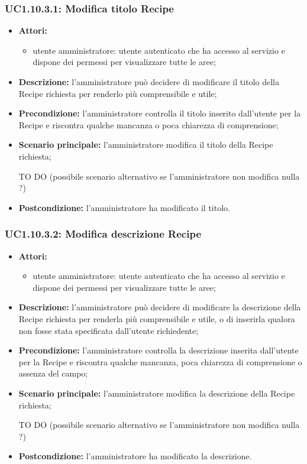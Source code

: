 \subsubsection{UC1.10.3.1: Modifica titolo Recipe}
	\begin{itemize}
		\item \textbf{Attori:}
		\begin{itemize}
			\item utente amministratore: utente autenticato che ha accesso al servizio e dispone dei permessi per visualizzare tutte le aree;
		\end{itemize}
		\item \textbf{Descrizione:} l'amministratore può decidere di modificare il titolo della Recipe richiesta per renderlo più comprensibile e utile;
		\item \textbf{Precondizione:} l'amministratore controlla il titolo inserito dall'utente per la Recipe e riscontra qualche mancanza o poca chiarezza di comprensione;
		\item \textbf{Scenario principale:} l'amministratore modifica il titolo della Recipe richiesta;
		\item [TO DO] (possibile scenario alternativo se l'amministratore non modifica nulla ?)
		\item \textbf{Postcondizione:} l'amministratore ha modificato il titolo.
	\end{itemize}

\subsubsection{UC1.10.3.2: Modifica descrizione Recipe}
	\begin{itemize}
		\item \textbf{Attori:}
		\begin{itemize}
			\item utente amministratore: utente autenticato che ha accesso al servizio e dispone dei permessi per visualizzare tutte le aree;
		\end{itemize}
		\item \textbf{Descrizione:} l'amministratore può decidere di modificare la descrizione della Recipe richiesta per renderla più comprensibile e utile, o di inserirla qualora non fosse stata specificata dall'utente richiedente;
		\item \textbf{Precondizione:} l'amministratore controlla la descrizione inserita dall'utente per la Recipe e riscontra qualche mancanza, poca chiarezza di comprensione o assenza del campo;
		\item \textbf{Scenario principale:} l'amministratore modifica la descrizione della Recipe richiesta;
		\item [TO DO] (possibile scenario alternativo se l'amministratore non modifica nulla ?)
		\item \textbf{Postcondizione:} l'amministratore ha modificato la descrizione.
	\end{itemize}

